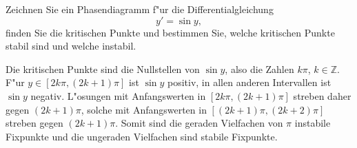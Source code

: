 Zeichnen Sie ein Phasendiagramm f"ur die Differentialgleichung
\begin{equation}
y'=\sin y,
\label{601:dgl}
\end{equation}
finden Sie die kritischen Punkte und bestimmen Sie, welche kritischen
Punkte stabil sind und welche instabil.

\begin{loesung}
Die kritischen Punkte sind die Nullstellen von $\sin y$, also die
Zahlen $k\pi$, $k\in\mathbb Z$.
F"ur $y\in[2k\pi,(2k+1)\pi]$ ist $\sin y$ positiv, in allen
anderen Intervallen ist $\sin y$ negativ.
L"osungen mit Anfangswerten in $[2k\pi,(2k+1)\pi]$ streben daher
gegen $(2k+1)\pi$, solche mit Anfangswerten in $[(2k+1)\pi, (2k+2)\pi]$
streben gegen $(2k+1)\pi$.
Somit sind die geraden Vielfachen von $\pi$ instabile Fixpunkte
und die ungeraden Vielfachen sind stabile Fixpunkte.
\end{loesung}

